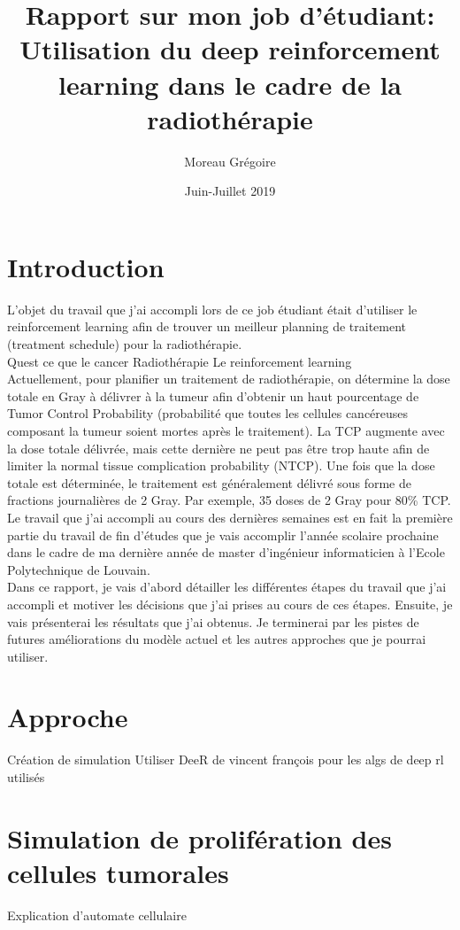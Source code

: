 \documentclass[12pt]{article}
\title{Rapport sur mon job d'étudiant:\\
Utilisation du deep reinforcement learning dans le cadre de la radiothérapie}
\author{Moreau Grégoire}
\date{Juin-Juillet 2019}
\begin{document}
\maketitle

\section{Introduction}
L'objet du travail que j'ai accompli lors de ce job étudiant était d'utiliser le reinforcement learning afin de trouver un meilleur planning de traitement (treatment schedule) pour la radiothérapie.\\
Quest ce que le cancer
Radiothérapie
Le reinforcement learning\\

Actuellement, pour planifier un traitement de radiothérapie, on détermine la dose totale en Gray à délivrer à la tumeur afin d'obtenir un haut pourcentage de Tumor Control Probability (probabilité que toutes les cellules cancéreuses composant la tumeur soient mortes après le traitement). La TCP augmente avec la dose totale délivrée, mais cette dernière ne peut pas être trop haute afin de limiter la normal tissue complication probability (NTCP).
Une fois que la dose totale est déterminée, le traitement est généralement délivré sous forme de fractions journalières de 2 Gray. Par exemple, 35 doses de 2 Gray pour 80\% TCP.\\

Le travail que j'ai accompli au cours des dernières semaines est en fait la première partie du travail de fin d'études que je vais accomplir l'année scolaire prochaine dans le cadre de ma dernière année de master d'ingénieur informaticien à l'Ecole Polytechnique de Louvain.\\
Dans ce rapport, je vais d'abord détailler les différentes étapes du travail que j'ai accompli et motiver les décisions que j'ai prises au cours de ces étapes. Ensuite, je vais présenterai les résultats que j'ai obtenus. Je terminerai par les pistes de futures améliorations du modèle actuel et les autres approches que je pourrai utiliser.\\


\section{Approche}
\citep{jalalimanesh}
Création de simulation
Utiliser DeeR de vincent françois pour les algs de deep rl utilisés

\section{Simulation de prolifération des cellules tumorales}
Explication d'automate cellulaire
\end{document}
